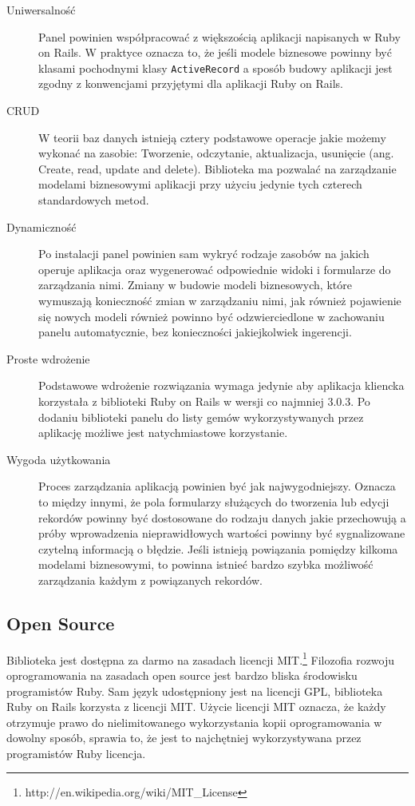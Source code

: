   \begin{description}
    \item[Uniwersalność] Panel powinien współpracować z większością aplikacji napisanych w Ruby on Rails. W praktyce oznacza to, że jeśli modele biznesowe powinny być klasami pochodnymi klasy \verb+ActiveRecord+ a sposób budowy aplikacji jest zgodny z konwencjami przyjętymi dla aplikacji Ruby on Rails.
    \item[CRUD] W teorii baz danych istnieją cztery podstawowe operacje jakie możemy wykonać na zasobie: Tworzenie, odczytanie, aktualizacja, usunięcie (ang. Create, read, update and delete). Biblioteka ma pozwalać na zarządzanie modelami biznesowymi aplikacji przy użyciu jedynie tych czterech standardowych metod.
    \item[Dynamiczność] Po instalacji panel powinien sam wykryć rodzaje zasobów na jakich operuje aplikacja oraz wygenerować odpowiednie widoki i formularze do zarządzania nimi. Zmiany w budowie modeli biznesowych, które wymuszają konieczność zmian w zarządzaniu nimi, jak również pojawienie się nowych modeli również powinno być odzwierciedlone w zachowaniu panelu automatycznie, bez konieczności jakiejkolwiek ingerencji.
    \item[Proste wdrożenie] Podstawowe wdrożenie rozwiązania wymaga jedynie aby aplikacja kliencka korzystała z biblioteki Ruby on Rails w wersji co najmniej 3.0.3. Po dodaniu biblioteki panelu do listy gemów wykorzystywanych przez aplikację możliwe jest natychmiastowe korzystanie.
    \item[Wygoda użytkowania] Proces zarządzania aplikacją powinien być jak najwygodniejszy. Oznacza to między innymi, że pola formularzy służących do tworzenia lub edycji rekordów powinny być dostosowane do rodzaju danych jakie przechowują a próby wprowadzenia nieprawidłowych wartości powinny być sygnalizowane czytelną informacją o błędzie. Jeśli istnieją powiązania pomiędzy kilkoma modelami biznesowymi, to powinna istnieć bardzo szybka możliwość zarządzania każdym z powiązanych rekordów.
  \end{description}
  
  \subsection{Open Source}
    Biblioteka jest dostępna za darmo na zasadach licencji MIT.\footnote{http://en.wikipedia.org/wiki/MIT\_License} Filozofia rozwoju oprogramowania na zasadach open source jest bardzo bliska środowisku programistów Ruby. Sam język udostępniony jest na licencji GPL, biblioteka Ruby on Rails korzysta z licencji MIT. Użycie licencji MIT oznacza, że każdy otrzymuje prawo do nielimitowanego wykorzystania kopii oprogramowania w dowolny sposób, sprawia to, że jest to najchętniej wykorzystywana przez programistów Ruby licencja.
    
